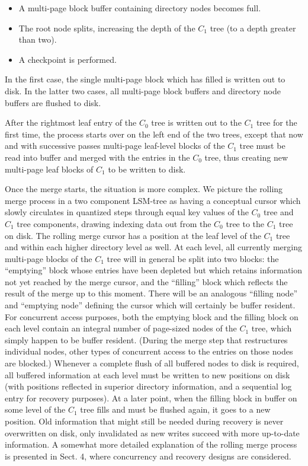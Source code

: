 \documentclass[a4paper,12pt,notitlepage,twoside,openright]{article}
\begin{document}
\begin{itemize}
\item
  A multi-page block buffer containing directory nodes becomes full.
\item
  The root node splits, increasing the depth of the \(C_1\) tree (to a depth
  greater than two).
\item
  A checkpoint is performed.
\end{itemize}


In the first case, the single multi-page block which has filled is
written out to disk. In the latter two cases, all multi-page block
buffers and directory node buffers are flushed to disk.

After the rightmost leaf entry of the \(C_0\) tree is written out to the \(C_1\)
tree for the first time, the process starts over on the left end of the
two trees, except that now and with successive passes multi-page
leaf-level blocks of the \(C_1\) tree must be read into buffer and merged
with the entries in the \(C_0\) tree, thus creating new multi-page leaf
blocks of \(C_1\) to be written to disk.

Once the merge starts, the situation is more complex. We picture the
rolling merge process in a two component LSM-tree as having a conceptual
cursor which slowly circulates in quantized steps through equal key
values of the \(C_0\) tree and \(C_1\) tree components, drawing indexing data out
from the \(C_0\) tree to the \(C_1\) tree on disk. The rolling merge cursor has a
position at the leaf level of the \(C_1\) tree and within each higher
directory level as well. At each level, all currently merging multi-page
blocks of the \(C_1\) tree will in general be split into two blocks: the
``emptying'' block whose entries have been depleted but which retains
information not yet reached by the merge cursor, and the ``filling'' block
which reflects the result of the merge up to this moment. There will be
an analogous ``filling node'' and ``emptying node'' defining the cursor
which will certainly be buffer resident. For concurrent access purposes,
both the emptying block and the filling block on each level contain an
integral number of page-sized nodes of the \(C_1\) tree, which simply happen
to be buffer resident. (During the merge step that restructures
individual nodes, other types of concurrent access to the entries on
those nodes are blocked.) Whenever a complete flush of all buffered
nodes to disk is required, all buffered information at each level must
be written to new positions on disk (with positions reflected in
superior directory information, and a sequential log entry for recovery
purposes). At a later point, when the filling block in buffer on some
level of the \(C_1\) tree fills and must be flushed again, it goes to a new
position. Old information that might still be needed during recovery is
never overwritten on disk, only invalidated as new writes succeed with
more up-to-date information. A somewhat more detailed explanation of the
rolling merge process is presented in Sect. 4, where concurrency and
recovery designs are considered.
\end{document}
